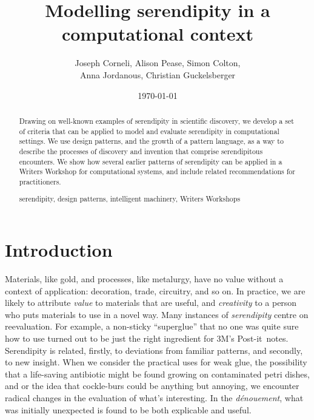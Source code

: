 \documentclass{llncs}
\newcommand{\keywords}[1]{\par\addvspace\baselineskip
\noindent\keywordname\enspace\ignorespaces#1}
\begin{document}
\title{Modelling serendipity in a computational context}
\author{Joseph Corneli, Alison Pease, Simon Colton,\\ Anna Jordanous, Christian Guckelsberger}
\date{\today}

\maketitle

\begin{abstract} 
Drawing on well-known examples of serendipity in scientific discovery,
we develop a set of criteria that can be applied to model and evaluate
serendipity in computational settings.  We use design patterns, and
the growth of a pattern language, as a way to describe the processes
of discovery and invention that comprise serendipitous encounters.  We
show how several earlier patterns of serendipity can be applied in a
Writers Workshop for computational systems, and include related
recommendations for practitioners.  \\[.5cm]
%
\keywords{serendipity,
design patterns,
intelligent machinery,
Writers Workshops}
\end{abstract}

\section{Introduction}

Materials, like gold, and processes, like metalurgy, have no value
without a context of application: decoration, trade, circuitry, and so
on.  In practice, we are likely to attribute \emph{value} to materials that
are useful, and \emph{creativity} to a person who puts materials to use in a
novel way.
%
Many instances of \emph{serendipity} centre on reevaluation.  For
example, a non-sticky ``superglue'' that no one was quite sure how to
use turned out to be just the right ingredient for 3M's
Post-it\texttrademark\ notes.
%
Serendipity is related, firstly, to deviations from familiar patterns,
and secondly, to new insight.
%
When we consider the practical uses for weak glue, the possibility
that a life-saving antibiotic might be found growing on contaminated
petri dishes, and or the idea that cockle-burs could be anything but
annoying, we encounter radical changes in the evaluation of what's
interesting.  In the \emph{d\'enouement}, what was initially
unexpected is found to be both explicable and useful.
\end{document}

